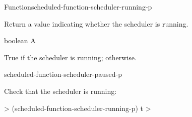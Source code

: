 \documentclass[10pt,twoside,english,pdftex]{article}
\begin{document}
\begin{functiondoc}{Function}{scheduled-function-scheduler-running-p}%
  {\noargs{}
    }
%

\fnsyntax

\fnpurpose Return a value indicating whether the 
scheduler is running.

\fnpackage {}

\fnmodule {}

\fnargs
\begin{args}{boolean}
\arg[boolean] A 
\end{args}

\fnreturns True if the  scheduler is running; \nil{}
otherwise.

\fnerrors
\nothreads{}

\begin{alsos}{scheduled-function-scheduler-paused-p}
\end{alsos}

\fnexample
Check that the  scheduler is running:
%
\W\supp
\begin{example}
  > (scheduled-function-scheduler-running-p)
  t
  >
\end{example}

\end{functiondoc}

\end{document}

